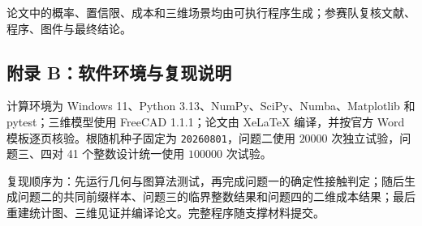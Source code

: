 论文中的概率、置信限、成本和三维场景均由可执行程序生成；参赛队复核文献、程序、图件与最终结论。

\subsection{附录 B：软件环境与复现说明}\label{ux9644ux5f55-bux8f6fux4ef6ux73afux5883ux4e0eux590dux73b0ux547dux4ee4}

计算环境为 Windows 11、Python 3.13、NumPy、SciPy、Numba、Matplotlib 和 pytest；三维模型使用 FreeCAD 1.1.1；论文由 XeLaTeX 编译，并按官方 Word 模板逐页核验。根随机种子固定为 \texttt{20260801}，问题二使用 \(20000\) 次独立试验，问题三、四对 41 个整数设计统一使用 \(100000\) 次试验。

复现顺序为：先运行几何与图算法测试，再完成问题一的确定性接触判定；随后生成问题二的共同前缀样本、问题三的临界整数结果和问题四的二维成本结果；最后重建统计图、三维见证并编译论文。完整程序随支撑材料提交。

\clearpage

